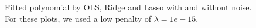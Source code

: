 \begin{figure} [H]
    \caption{Fitted polynomial by OLS, Ridge and Lasso with and without noise. For these plots, we used a low penalty of $\lambda=1e-15$.}%
    \label{fig:example}%
\end{figure}



